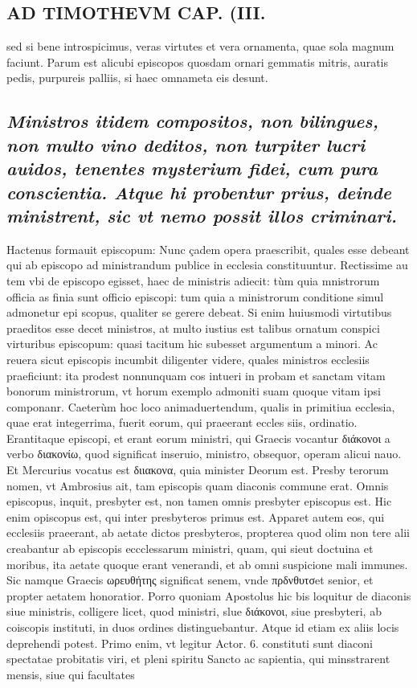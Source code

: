 \documentclass{article}
\begin{document}
\begin{pages}
\section*{AD TIMOTHEVM CAP. (III. }
\marginpar{[ p.81 ]}\pstart sed si bene introspicimus, veras virtutes et vera ornamenta, quae sola magnum faciunt. Parum est alicubi episcopos quosdam ornari gemmatis mitris, auratis pedis, purpureis palliis, si haec omnameta eis desunt.  \pend
{}
{}
\subsection*{\textit{Ministros itidem compositos, non bilingues, non multo vino deditos, non turpiter lucri auidos, tenentes mysterium fidei, cum pura conscientia. Atque hi probentur prius, deinde ministrent, sic vt nemo possit illos criminari. }}\pstart Hactenus formauit episcopum: Nunc çadem opera praescribit, quales esse debeant qui ab episcopo ad ministrandum publice in ecclesia constituuntur. Rectissime au tem vbi de episcopo egisset, haec de ministris adiecit: tùm quia mnistrorum officia as finia sunt officio episcopi: tum quia a ministrorum conditione simul admonetur epi scopus, qualiter se gerere debeat. Si enim huiusmodi virtutibus praeditos esse decet ministros, at multo iustius est talibus ornatum conspici virturibus episcopum: quasi tacitum hic subesset argumentum a minori. Ac reuera sicut episcopis incumbit diligenter videre, quales ministros ecclesiis praeficiunt: ita prodest nonnunquam cos intueri in probam et sanctam vitam bonorum ministrorum, vt horum exemplo admoniti suam quoque vitam ipsi componanr. Caeterùm hoc loco animaduertendum, qualis in primitiua ecclesia, quae erat integerrima, fuerit eorum, qui praeerant eccles siis, ordinatio. Erantitaque episcopi, et erant eorum ministri, qui Graecis vocantur διάκονοι a verbo διακονίω, quod significat inseruio, ministro, obsequor, operam alicui nauo. Et Mercurius vocatus est διιακονα, quia minister Deorum est. Presby terorum nomen, vt Ambrosius ait, tam episcopis quam diaconis commune erat. Omnis episcopus, inquit, presbyter est, non tamen omnis presbyter episcopus est. Hic enim opiscopus est, qui inter presbyteros primus est. Apparet autem eos, qui ecclesiis praeerant, ab aetate dictos presbyteros, propterea quod olim non tere alii creabantur ab episcopis eccclessarum ministri, quam, qui sieut doctuina et moribus, ita aetate quoque erant venerandi, et ab omni suspicione mali immunes. Sic namque Graecis ωρευθήτης significat senem, vnde πρδνθυτσet senior, et propter aetatem honoratior. Porro quoniam Apostolus hic bis loquitur de diaconis siue ministris, colligere licet, quod ministri, slue διάκονοι, siue presbyteri, ab coiscopis instituti, in duos ordines distinguebantur. Atque id etiam ex aliis locis deprehendi potest. Primo enim, vt legitur Actor. 6. constituti sunt diaconi spectatae probitatis viri, et pleni spiritu Sancto ac sapientia, qui minsstrarent mensis, siue qui facultates 
\end{pages}
\end{document}
